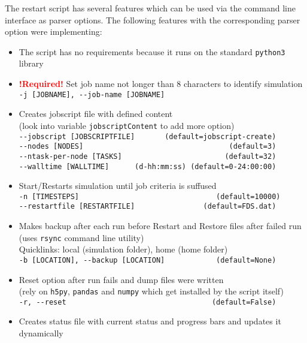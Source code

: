 The restart script has several features which can be used via the command line interface as parser options. The following features with the corresponding parser option were implementing:
\begin{itemize}
    \item The script has no requirements because it runs on the standard \texttt{python3} library
    \item \textbf{\textcolor{red}{!Required!}} Set job name not longer than 8 characters to identify simulation\\
          \texttt{-j [JOBNAME], -\/-job-name [JOBNAME]}
    \item Creates jobscript file with defined content\\
          (look into variable \texttt{jobscriptContent} to add more option) \\
          \texttt{-\/-jobscript [JOBSCRIPTFILE]~~~~~~~(default=jobscript-create)}\\
          \texttt{-\/-nodes [NODES]~~~~~~~~~~~~~~~~~~~~~~~~~~~~~~~~~~(default=3)}\\
          \texttt{-\/-ntask-per-node [TASKS]~~~~~~~~~~~~~~~~~~~~~~~~(default=32)}\\
          \texttt{-\/-walltime [WALLTIME]~~~~~~(d-hh:mm:ss)~(default=0-24:00:00)}
    \item Start/Restarts simulation until job criteria is suffused \\
          \texttt{-n [TIMESTEPS]~~~~~~~~~~~~~~~~~~~~~~~~~~~~~~\,\,(default=10000)}\\
          \texttt{-\/-restartfile [RESTARTFILE]~~~~~~~~~~~~~~~~(default=FDS.dat)}
    \item Makes backup after each run before Restart and Restore files after failed run\\
          (uses \texttt{rsync} command line utility)\\
          Quicklinks: local (simulation folder), home (home folder) \\
          \texttt{-b [LOCATION], -\/-backup [LOCATION]~~~~~~~~~~~\,(default=None)}
    \item Reset option after run fails and dump files were written\\
          (rely on \texttt{h5py}, \texttt{pandas} and \texttt{numpy} which get installed by the script itself)\\
          \texttt{-r, -\/-reset~~~~~~~~~~~~~~~~~~~~~~~~~~~~~~~~~\,(default=False)}
    \item Creates status file with current status and progress bars and updates it dynamically\\

\end{itemize}
